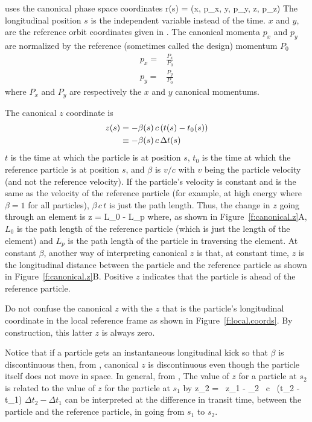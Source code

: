 \bmad uses the canonical phase space coordinates 
\Begineq
  \Bf r(s) = (x, p_x, y, p_y, z, p_z)
\Endeq
The longitudinal position $s$ is the independent variable instead of
the time.  $x$ and $y$, are the reference orbit coordinates given in
.  The canonical momenta $p_x$ and $p_y$ are
normalized by the reference (sometimes called the
design) momentum $P_0$
\begin{align}
  p_x = &\frac{P_x}{P_0} \\
  p_y = &\frac{P_y}{P_0}
\end{align}
where $P_x$ and $P_y$ are respectively the $x$ and $y$ canonical momentums.

The canonical $z$ coordinate is 
\begin{align}
  z(s) &= -\beta(s) \, c \, (t(s) - t_0(s)) \nonumber \\
    &\equiv - \beta(s) \, c \, \Delta t(s)
  \label{zbctt}
\end{align}
$t$ is the time at which the particle is at position $s$, $t_0$ is the
time at which the reference particle is at position $s$, and $\beta$ is
$v/c$ with $v$ being the particle velocity (and not the reference velocity). 
If the particle's velocity is constant and is the same as the 
velocity of the reference particle
(for example, at high energy where $\beta = 1$ for all particles), 
$\beta \, c \, t$ is just the path length. Thus, the change in
$z$ going through an element is
\Begineq
  \Delta z = L_0 - L_p
\Endeq
where, as shown in Figure~\ref{f:canonical.z}A, $L_0$ is the path
length of the reference particle (which is just the length of the
element) and $L_p$ is the path length of the particle in traversing the
element. At constant $\beta$, another way of interpreting canonical $z$
is that, at constant time, $z$ is the longitudinal distance between the
particle and the reference particle as shown in
Figure~\ref{f:canonical.z}B. Positive $z$ indicates that the particle
is ahead of the reference particle.

Do not confuse the canonical $z$ with the $z$ that is the particle's
longitudinal coordinate in the local reference frame as shown in
Figure~\ref{f:local.coords}. By construction, this latter $z$ is
always zero.

Notice that if a particle gets an instantaneous longitudinal kick so
that $\beta$ is discontinuous then, from , canonical $z$ is
discontinuous even though the particle itself does not move in
space. In general, from , The value of $z$ for a particle at
$s_2$ is related to the value of $z$ for the particle at $s_1$ by
\Begineq
  z_2 =  \, z_1 - 
  \beta_2 \, c \, (\Delta t_2 - \Delta t_1)
  \label{zbbzb}
\Endeq
$\Delta t_2 - \Delta t_1$ can be interpreted at the difference in
transit time, between the particle and the reference particle, in going
from $s_1$ to $s_2$.

